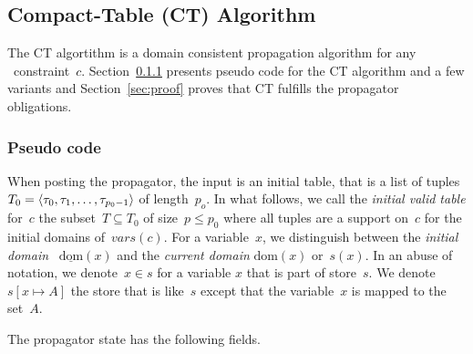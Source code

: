 \documentclass[a4paper,11pt]{article}
\newcommand{\Secref}[1]{Section~\ref{#1}}
\newcommand{\Table}{\Constraint{Table}~}
\newcommand{\Dom}[1]{\text{dom}({#1})}
\newcommand{\Dominit}[1]{\underline{\text{dom}}(#1)}
\numberwithin{equation}{section}
\begin{document}
\subsection{Compact-Table (CT) Algorithm}
\label{sec:ct}
The CT algortithm is a domain consistent propagation
algorithm for any \Table constraint~$c$. \Secref{ct:pseudo}
presents pseudo code for the CT algorithm and a few variants
and \Secref{sec:proof} proves that CT fulfills the propagator
obligations.

\subsubsection{Pseudo code}
\label{ct:pseudo}

When posting the propagator, the input is an initial table, that is
a list of tuples $T_0 = \left\langle\tau_0, \tau_1, \ldots, \tau_{p_0-1}\right\rangle$ of
length~$p_o$. In what follows, we call the \emph{initial valid table}
for~$c$ the subset~$T \subseteq T_0$ of size~$p \leq p_0$ where all
tuples are a support on~$c$ for the initial domains of~$vars(c)$.
For a variable~$x$, we distinguish between the \emph{initial domain}
~$\Dominit{x}$ and the \emph{current domain} $\Dom{x}$ or~$s(x)$.
In an abuse of notation, we denote~$x \in s$ for a variable
$x$ that is part of store~$s$. We denote~$s[x \mapsto A]$
the store that is like~$s$ except that the variable~$x$ is mapped
to the set~$A$.

The propagator state has the following fields.
\end{document}

